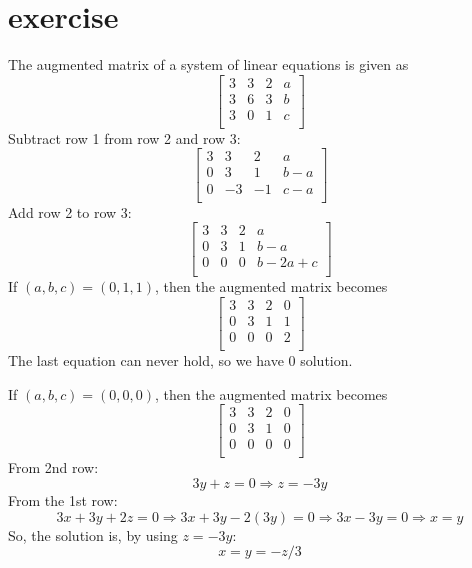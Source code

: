 \documentclass{article}
\begin{document}
\section{exercise}
The augmented matrix of a system of linear equations is given as
\[
    \left[
        \begin{array}{ccc|c}
            3 & 3 & 2 & a \\
            3 & 6 & 3 & b \\
            3 & 0 & 1 & c \\
        \end{array}
        \right]
\]
Subtract row 1 from row 2 and row 3:
\[
    \left[
        \begin{array}{ccc|c}
            3 & 3  & 2  & a     \\
            0 & 3  & 1  & b - a \\
            0 & -3 & -1 & c - a \\
        \end{array}
        \right]
\]
Add row 2 to row 3:
\[
    \left[
        \begin{array}{ccc|c}
            3 & 3 & 2 & a          \\
            0 & 3 & 1 & b - a      \\
            0 & 0 & 0 & b - 2a + c \\
        \end{array}
        \right]
\]
If \((a, b, c) = (0, 1, 1)\), then the augmented matrix becomes
\[
    \left[
        \begin{array}{ccc|c}
            3 & 3 & 2 & 0 \\
            0 & 3 & 1 & 1 \\
            0 & 0 & 0 & 2 \\
        \end{array}
        \right]
\]
The last equation can never hold, so we have 0 solution.

If \((a, b, c) = (0, 0, 0)\), then the augmented matrix becomes
\[
    \left[
        \begin{array}{ccc|c}
            3 & 3 & 2 & 0 \\
            0 & 3 & 1 & 0 \\
            0 & 0 & 0 & 0 \\
        \end{array}
        \right]
\]
From 2nd row: \[3y + z = 0 \Rightarrow z = -3y\]
From the 1st row: \[3x + 3y + 2z = 0 \Rightarrow 3x + 3y - 2(3y) = 0 \Rightarrow 3x - 3y = 0 \Rightarrow x = y\]
So, the solution is, by using \(z = -3y\):
\[x=y=-z/3\]
\end{document}
